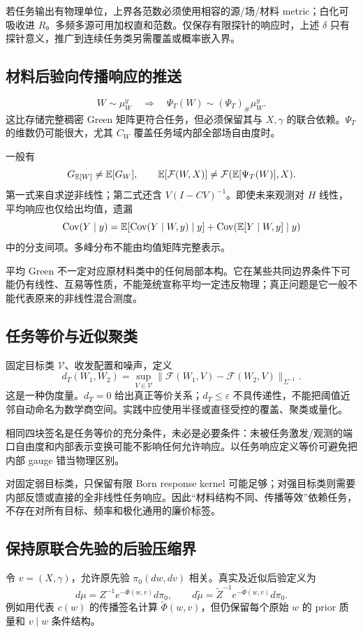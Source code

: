 若任务输出有物理单位，上界各范数必须使用相容的源/场/材料 metric；白化可吸收进 $R$。多频多源可用加权直和范数。仅保存有限探针的响应时，上述 $\delta$ 只有探针意义，推广到连续任务类另需覆盖或概率嵌入界。

\subsection{材料后验向传播响应的推送}
\[
W\sim\mu_W^y\quad\Longrightarrow\quad
\Psi_T(W)\sim(\Psi_T)_\#\mu_W^y.
\]
这比存储完整稠密 Green 矩阵更符合任务，但必须保留其与 $X,\gamma$ 的联合依赖。$\Psi_T$ 的维数仍可能很大，尤其 $C_W$ 覆盖任务域内部全部场自由度时。

一般有
\[
G_{\mathbb E[W]}\ne\mathbb E[G_W],\qquad
\mathbb E[\mathcal F(W,X)]\ne
\mathcal F(\mathbb E[\Psi_T(W)],X).
\]
第一式来自求逆非线性；第二式还含 $V(I-CV)^{-1}$。即使未来观测对 $H$ 线性，平均响应也仅给出均值，遗漏
\[
\operatorname{Cov}(Y\mid y)
=\mathbb E[\operatorname{Cov}(Y\mid W,y)\mid y]
+\operatorname{Cov}(\mathbb E[Y\mid W,y]\mid y)
\]
中的分支间项。多峰分布不能由均值矩阵完整表示。

平均 Green 不一定对应原材料类中的任何局部本构。它在某些共同边界条件下可能仍有线性、互易等性质，不能笼统宣称平均一定违反物理；真正问题是它一般不能代表原来的非线性混合测度。

\subsection{任务等价与近似聚类}
固定目标类 $\mathcal V$、收发配置和噪声，定义
\[
d_T(W_1,W_2)=\sup_{V\in\mathcal V}
\|\mathcal F(W_1,V)-\mathcal F(W_2,V)\|_{\Sigma^{-1}}.
\]
这是一种伪度量。$d_T=0$ 给出真正等价关系；$d_T\le\varepsilon$ 不具传递性，不能把阈值近邻自动命名为数学商空间。实践中应使用半径或直径受控的覆盖、聚类或量化。

相同四块签名是任务等价的充分条件，未必是必要条件：未被任务激发/观测的端口自由度和内部表示变换可能不影响任何允许响应。以任务响应定义等价可避免把内部 gauge 错当物理区别。

对固定弱目标类，只保留有限 Born response kernel 可能足够；对强目标类则需要内部反馈或直接的全非线性任务响应。因此“材料结构不同、传播等效”依赖任务，不存在对所有目标、频率和极化通用的廉价标签。

\subsection{保持原联合先验的后验压缩界}
令 $v=(X,\gamma)$，允许原先验 $\pi_0(dw,dv)$ 相关。真实及近似后验定义为
\[
d\mu=Z^{-1}e^{-\Phi(w,v)}d\pi_0,\qquad
d\widetilde\mu=\widetilde Z^{-1}e^{-\widetilde\Phi(w,v)}d\pi_0.
\]
例如用代表 $c(w)$ 的传播签名计算 $\widetilde\Phi(w,v)$，但仍保留每个原始 $w$ 的 prior 质量和 $v\mid w$ 条件结构。

